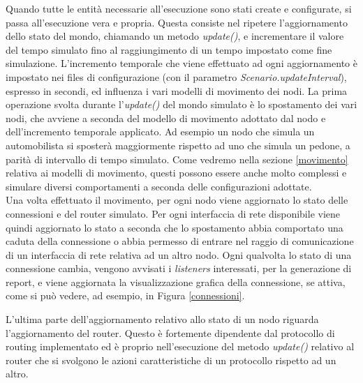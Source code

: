 Quando tutte le entità necessarie all'esecuzione sono stati create e configurate, si passa all'esecuzione vera e propria.
Questa consiste nel ripetere l'aggiornamento dello stato del mondo, chiamando un metodo \textit{update()}, e incrementare il valore del tempo simulato fino al raggiungimento di un tempo impostato come fine simulazione. L'incremento temporale che viene effettuato ad ogni aggiornamento è impostato nei files di configurazione (con il parametro \textit{Scenario.updateInterval}), espresso in secondi, ed influenza i vari modelli di movimento dei nodi. La prima operazione svolta durante l'\textit{update()} del mondo simulato è lo spostamento dei vari nodi, che avviene a seconda del modello di movimento adottato dal nodo e dell'incremento temporale applicato. Ad esempio un nodo che simula un automobilista si sposterà maggiormente rispetto ad uno che simula un pedone, a parità di intervallo di tempo simulato. Come vedremo nella sezione \ref{movimento} relativa ai modelli di movimento, questi possono essere anche molto complessi e simulare diversi comportamenti a seconda delle configurazioni adottate.
\\

Una volta effettuato il movimento, per ogni nodo viene aggiornato lo stato delle connessioni e del router simulato. Per ogni interfaccia di rete disponibile viene quindi aggiornato lo stato a seconda che lo spostamento abbia comportato una caduta della connessione o abbia permesso di entrare nel raggio di comunicazione di un interfaccia di rete relativa ad un altro nodo. Ogni qualvolta lo stato di una connessione cambia, vengono avvisati i \textit{listeners} interessati, per la generazione di report, e viene aggiornata la visualizzazione grafica della connessione, se attiva, come si può vedere, ad esempio, in Figura \ref{connessioni}.
\\

L'ultima parte dell'aggiornamento relativo allo stato di un nodo riguarda l'aggiornamento del router. Questo è fortemente dipendente dal protocollo di routing implementato ed è proprio nell'esecuzione del metodo \textit{update()} relativo al router che si svolgono le azioni caratteristiche di un protocollo rispetto ad un altro.

